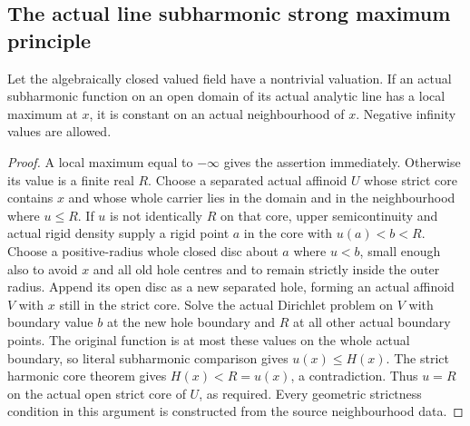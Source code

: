 \subsection{The actual line subharmonic strong maximum principle}\label{subsec:fc-line-subharmonic-maximum}

\begin{theorem}\label{thm:fc-line-subharmonic-strong-maximum}
\leanok
{}
Let the algebraically closed valued field have a nontrivial valuation.
If an actual subharmonic function on an open domain of its actual analytic
line has a local maximum at $x$, it is constant on an actual neighbourhood
of $x$. Negative infinity values are allowed.
\end{theorem}

\begin{proof}
A local maximum equal to $-\infty$ gives the assertion immediately.
Otherwise its value is a finite real $R$. Choose a separated actual
affinoid $U$ whose strict core contains $x$ and whose whole carrier lies
in the domain and in the neighbourhood where $u\le R$.
If $u$ is not identically $R$ on that core, upper semicontinuity and actual
rigid density supply a rigid point $a$ in the core with $u(a)<b<R$.
Choose a positive-radius whole closed disc about $a$ where $u<b$, small
enough also to avoid $x$ and all old hole centres and to remain strictly
inside the outer radius. Append its open disc as a new separated hole,
forming an actual affinoid $V$ with $x$ still in the strict core.
Solve the actual Dirichlet problem on $V$ with boundary value $b$ at the
new hole boundary and $R$ at all other actual boundary points.
The original function is at most these values on the whole actual
boundary, so literal subharmonic comparison gives $u(x)\le H(x)$.
The strict harmonic core theorem gives $H(x)<R=u(x)$, a contradiction.
Thus $u=R$ on the actual open strict core of $U$, as required.
Every geometric strictness condition in this argument is constructed
from the source neighbourhood data.
\end{proof}
